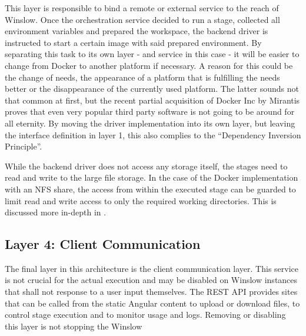 This layer is responsible to bind a remote or external service to the reach of Winslow.
Once the orchestration service decided to run a stage, collected all environment variables and prepared the workspace, the backend driver is instructed to start a certain image with said prepared environment.
By separating this task to its own layer - and service in this case - it will be easier to change from Docker to another platform if necessary.
A reason for this could be the change of needs, the appearance of a platform that is fulfilling the needs better or the disappearance of the currently used platform.
The latter sounds not that common at first, but the recent partial acquisition of Docker Inc by Mirantis\cite{docker:acquisition} proves that even very popular third party software is not going to be around for all eternity.
By moving the driver implementation into its own layer, but leaving the interface definition in layer 1, this also complies to the \enquote{Dependency Inversion Principle}. 

While the backend driver does not access any storage itself, the stages need to read and write to the large file storage.
In the case of the Docker implementation with an NFS share, the access from within the executed stage can be guarded to limit read and write access to only the required working directories.
This is discussed more in-depth in .

\subsection{Layer 4: Client Communication}

The final layer in this architecture is the client communication layer.
This service is not crucial for the actual execution and may be disabled on Winslow instances that shall not response to a user input themselves.
The REST API provides sites that can be called from the static Angular content to upload or download files, to control stage execution and to monitor usage and logs.
Removing or disabling this layer is not stopping the Winslow


